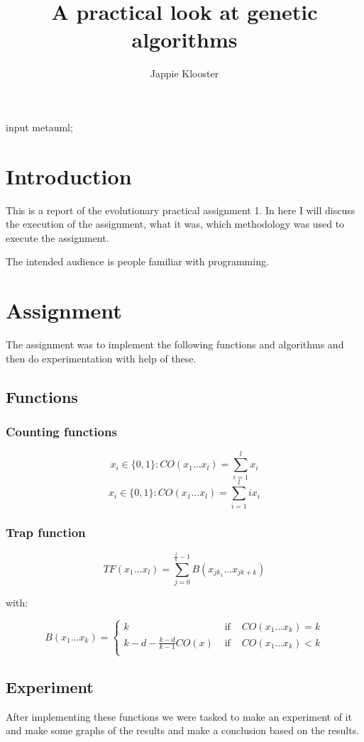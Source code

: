 \documentclass{article}
\begin{document}
\begin{empfile}
\begin{empcmds}
input metauml;
\end{empcmds}
\author{Jappie Klooster}
\title{A practical look at genetic algorithms}
\maketitle

\section{Introduction}
This is a report of the evolutionary practical assignment 1.
In here I will discuss the execution of the assignment, what it was, which
methodology was used to execute the assignment.

The intended audience is people familiar with programming.

\section{Assignment}
The assignment was to implement the following functions and algorithms and
then do experimentation with help of these.

\subsection{Functions}
\subsubsection{Counting functions}
\[x_i \in \{0,1\}:CO(x_1\dots x_l)=\sum^l_{i=1}x_i\]
\[x_i \in \{0,1\}:CO(x_1\dots x_l)=\sum^l_{i=1}i x_i\]
\subsubsection{Trap function}
\[TF(x_1\dots x_l) = \sum^{\frac{l}{k}-1}_{j=0}B(x_{jk_1}\dots x_{jk+k})\]

with:

\[B(x_1\dots x_k)=\left\{
	\begin{matrix}
		k & \mbox{ if } &   CO(x_1\dots x_k) = k \\
		k - d - \frac{k-d}{k-1} CO(x) & \mbox{ if } & CO(x_1\dots x_k) < k \\
	\end{matrix}
\right. \]

\subsection{Experiment}
After implementing these functions we were tasked to make an experiment of it
and make some graphs of the results and make a conclusion based on the results.


\end{empfile}
\end{document}
